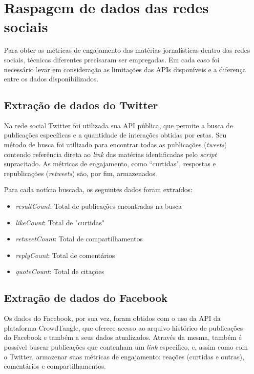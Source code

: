 \documentclass[
	12pt,
	oneside,
	a4paper,
	english,
	brazil
]{abntex2ppgsi}
\begin{document}
\section{Raspagem de dados das redes sociais}
Para obter as métricas de engajamento das matérias jornalísticas dentro das redes sociais, técnicas diferentes precisaram ser empregadas. Em cada caso foi necessário levar em consideração as limitações das APIs disponíveis e a diferença entre os dados disponibilizados.

\subsection{Extração de dados do Twitter}

Na rede social Twitter foi utilizada sua API pública, que permite a busca de publicações específicas e a quantidade de interações obtidas por estas. Seu método de busca foi utilizado para encontrar todas as publicações (\textit{tweets}) contendo referência direta ao \textit{link} das matérias identificadas pelo \textit{script} supracitado. As métricas de engajamento, como ``curtidas", respostas e republicações (\textit{retweets}) são, por fim, armazenados.

Para cada notícia buscada, os seguintes dados foram extraídos:
\begin{itemize}
    \item \textit{resultCount}: Total de publicações encontradas na busca
    \item \textit{likeCount}: Total de "curtidas"
    \item \textit{retweetCount}: Total de compartilhamentos
    \item \textit{replyCount}: Total de comentários
    \item \textit{quoteCount}: Total de citações
\end{itemize}

\subsection{Extração de dados do Facebook}

Os dados do Facebook, por sua vez, foram obtidos com o uso da API da plataforma CrowdTangle, que oferece acesso ao arquivo histórico de publicações do Facebook e também a seus dados atualizados. Através da mesma, também é possível buscar publicações que contenham um \textit{link} específico, e, assim como com o Twitter, armazenar suas métricas de engajamento: reações (curtidas e outras), comentários e compartilhamentos.
\end{document}
